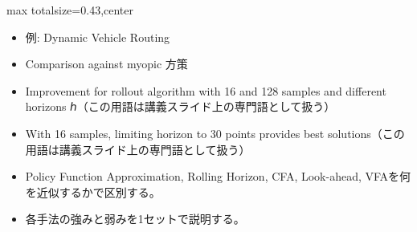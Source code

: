\clearpage
{}
\begin{minipage}[t]{0.405\textwidth}
\begin{adjustbox}{max totalsize={\textwidth}{0.43\textheight},center}
\begin{minipage}{\textwidth}\scriptsize
{}\begin{itemize}
\item 例: Dynamic Vehicle Routing
\item Comparison against myopic 方策
\item Improvement for rollout algorithm with 16 and 128 samples and different horizons ℎ（この用語は講義スライド上の専門語として扱う）
\item With 16 samples, limiting horizon to 30 points provides best solutions（この用語は講義スライド上の専門語として扱う）
\end{itemize}\begin{itemize}
\item Policy Function Approximation, Rolling Horizon, CFA, Look-ahead, VFAを何を近似するかで区別する。
\item 各手法の強みと弱みを1セットで説明する。
\end{itemize}
\end{minipage}
\end{adjustbox}
\end{minipage}\hfill
